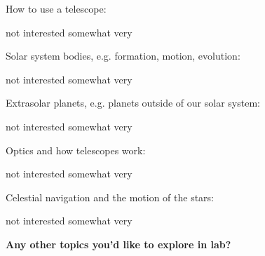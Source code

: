 \documentclass[12pt]{article}
\begin{document}
\vspace{0.1in}

How to use a telescope:
\begin{center}
	not interested \hspace{0.3in} somewhat \hspace{0.3in} very
\end{center}

\vspace{0.1in}

Solar system bodies, e.g. formation, motion, evolution:
\begin{center}
	not interested \hspace{0.3in} somewhat \hspace{0.3in} very
\end{center}

\vspace{0.1in}

Extrasolar planets, e.g. planets outside of our solar system:
\begin{center}
	not interested \hspace{0.3in} somewhat \hspace{0.3in} very
\end{center}

\vspace{0.1in}

Optics and how telescopes work:
\begin{center}
	not interested \hspace{0.3in} somewhat \hspace{0.3in} very
\end{center}

\vspace{0.1in}

Celestial navigation and the motion of the stars:
\begin{center}
	not interested \hspace{0.3in} somewhat \hspace{0.3in} very
\end{center}

\vspace{0.2in}
\noindent\textbf{Any other topics you'd like to explore in lab?}
\vspace{0.4in}


	




\end{document}
